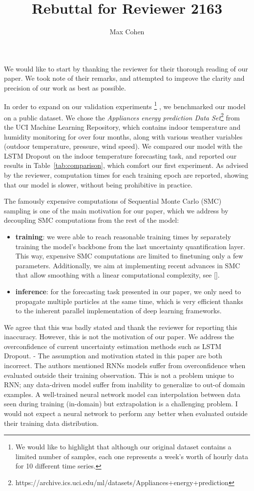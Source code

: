 \documentclass{article}
\title{Rebuttal for Reviewer 2163}
\author{Max Cohen}
\affil{Samovar, T\'el\'ecom SudParis, CITI, TIPIC, Institut Polyechnique de Paris}
\date{}
\begin{document}
\maketitle

We would like to start by thanking the reviewer for their thorough reading of our paper.
We took note of their remarks, and attempted to improve the clarity and precision of our work as best as possible.

In order to expand on our validation experiments
\footnote{We would like to highlight that although our original dataset contains a limited number of samples, each one represents a week's worth of hourly data for 10 different time series.}
, we benchmarked our model on a public dataset.
We chose the \textit{Appliances energy prediction Data Set}\footnote{https://archive.ics.uci.edu/ml/datasets/Appliances+energy+prediction} from the UCI Machine Learning Repository, which contains indoor temperature and humidity monitoring for over four months, along with various weather variables (outdoor temperature, pressure, wind speed).
We compared our model with the LSTM Dropout on the indoor temperature forecasting task, and reported our results in Table~\ref{tab:comparison}, which comfort our first experiment.
As advised by the reviewer, computation times for each training epoch are reported, showing that our model is slower, without being prohibitive in practice.

The famously expensive computations of Sequential Monte Carlo (SMC) sampling is one of the main motivation for our paper, which we address by decoupling SMC computations from the rest of the model:
\begin{itemize}
	\item \textbf{training}: we were able to reach reasonable training times by separately training the model's backbone from the last uncertainty quantification layer.
	      This way, expensive SMC computations are limited to finetuning only a few parameters.
	      Additionally, we aim at implementing recent advances in SMC that allow smoothing with a linear computational complexity, see [].
	\item \textbf{inference}: for the forecasting task presented in our paper, we only need to propagate multiple particles at the same time, which is very efficient thanks to the inherent parallel implementation of deep learning frameworks.
\end{itemize}


We agree that this was badly stated and thank the reviewer for reporting this inaccuracy. However, this is not the motivation of our paper. We address the overconfidence of current uncertainty estimation methods such as LSTM Dropout.
- The assumption and motivation stated in this paper are both incorrect. The authors mentioned RNNs models suffer from overconfidence when evaluated outside their training observation. This is not a problem unique to RNN; any data-driven model suffer from inability to generalize to out-of domain examples. A well-trained neural network model can interpolation between data seen during training (in-domain) but extrapolation is a challenging problem. I would not expect a neural network to perform any better when evaluated outside their training data distribution.
\end{document}
